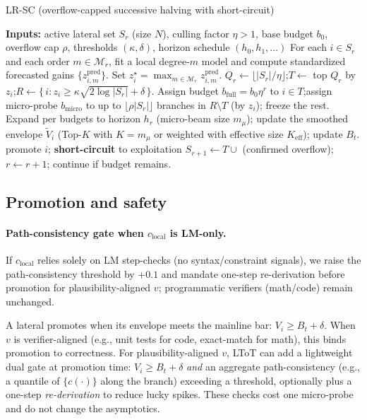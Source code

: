 \documentclass{article}
\begin{document}
\begin{algorithm}[t]
\caption{LR-SC (overflow-capped successive halving with short-circuit)}
\label{alg:lrscr}
\begin{algorithmic}[1]
\State \textbf{Inputs:} active lateral set $S_r$ (size $N$), culling factor $\eta>1$, base budget $b_0$, overflow cap $\rho$, thresholds $(\kappa,\delta)$, horizon schedule $(h_0,h_1,\dots)$
\State For each $i\in S_r$ and each order $m\in\mathcal{M}_r$, fit a local degree-$m$ model and compute standardized forecasted gains $\{z^{\mathrm{pred}}_{i,m}\}$. Set $z_i^{\star}=\max_{m\in\mathcal{M}_r} z^{\mathrm{pred}}_{i,m}$.
\State $Q_r \leftarrow \lfloor |S_r|/\eta \rfloor$;\quad $T \leftarrow$ top $Q_r$ by $z_i$;\quad $R \leftarrow \{\,i : z_i \ge \kappa \sqrt{2\log |S_r|} + \delta\,\}$.
\State Assign budget $b_{\text{full}} = b_0 \eta^r$ to $i\in T$;\quad assign micro-probe $b_{\text{micro}}$ to up to $\lfloor \rho |S_r|\rfloor$ branches in $R\setminus T$ (by $z_i$); freeze the rest.
\State Expand per budgets to horizon $h_r$ (micro-beam size $m_{\mu}$); update the smoothed envelope $\tilde V_i$ (Top-$K$ with $K{=}m_{\mu}$ or weighted with effective size $K_{\mathrm{eff}}$); update $B_t$.
  \State promote $i$; \textbf{short-circuit} to exploitation
\EndIf
\State $S_{r+1} \leftarrow T \cup$ (confirmed overflow); $r\leftarrow r+1$; continue if budget remains.
\end{algorithmic}
\end{algorithm}

\vspace{-0.5em}
\subsection{Promotion and safety}
\label{sec:promotion}
\paragraph{Path-consistency gate when $c_{\text{local}}$ is LM-only.}
If $c_{\text{local}}$ relies solely on LM step-checks (no syntax/constraint signals), we raise the path-consistency threshold by $+0.1$
and mandate one-step re-derivation before promotion for plausibility-aligned $v$; programmatic verifiers (math/code) remain unchanged.


A lateral promotes when its envelope meets the mainline bar: $V_i \ge B_t+\delta$.
When $v$ is verifier-aligned (e.g., unit tests for code, exact-match for math), this binds promotion to correctness.
For plausibility-aligned $v$, LToT can add a lightweight dual gate at promotion time:
$V_i\!\ge\!B_t{+}\delta$ \emph{and} an aggregate path-consistency (e.g., a quantile of $\{c(\cdot)\}$ along the branch) exceeding a threshold, optionally plus a one-step \emph{re-derivation} to reduce lucky spikes.
These checks cost one micro-probe and do not change the asymptotics.
\end{document}
